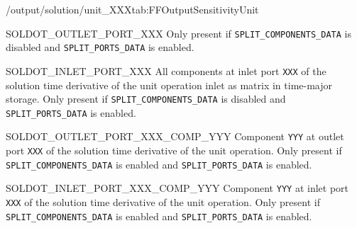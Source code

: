 \begin{groupscope}{/output/solution/unit\_XXX}{tab:FFOutputSensitivityUnit}
\begin{dataset}[type=double,unit={\si{\mol\per\cubic\metre\of{IV}\per\second}}]{SOLDOT\_OUTLET\_PORT\_XXX}
    Only present if \texttt{SPLIT\_COMPONENTS\_DATA} is disabled and \texttt{SPLIT\_PORTS\_DATA} is enabled.
  \end{dataset}
  \begin{dataset}[type=double,unit={\si{\mol\per\cubic\metre\of{IV}\per\second}}]{SOLDOT\_INLET\_PORT\_XXX}
    All components at inlet port \texttt{XXX} of the solution time derivative of the unit operation inlet as matrix in time-major storage.
    Only present if \texttt{SPLIT\_COMPONENTS\_DATA} is disabled and \texttt{SPLIT\_PORTS\_DATA} is enabled.
  \end{dataset}
  \begin{dataset}[type=double,unit={\si{\mol\per\cubic\metre\of{IV}\per\second}}]{SOLDOT\_OUTLET\_PORT\_XXX\_COMP\_YYY}
    Component \texttt{YYY} at outlet port \texttt{XXX} of the solution time derivative of the unit operation.
    Only present if \texttt{SPLIT\_COMPONENTS\_DATA} is enabled and \texttt{SPLIT\_PORTS\_DATA} is enabled.
  \end{dataset}
  \begin{dataset}[type=double,unit={\si{\mol\per\cubic\metre\of{IV}\per\second}}]{SOLDOT\_INLET\_PORT\_XXX\_COMP\_YYY}
    Component \texttt{YYY} at inlet port \texttt{XXX} of the solution time derivative of the unit operation.
    Only present if \texttt{SPLIT\_COMPONENTS\_DATA} is enabled and \texttt{SPLIT\_PORTS\_DATA} is enabled.
  \end{dataset}
\end{groupscope}

